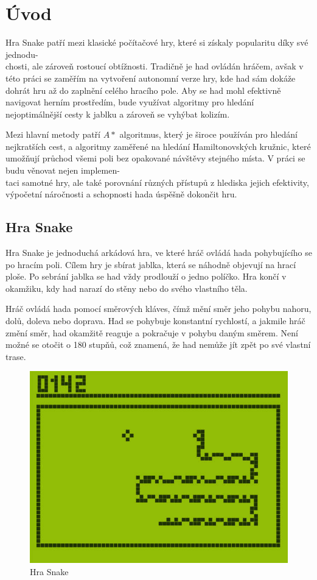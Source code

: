 \chapter{Úvod}

Hra Snake patří mezi klasické počítačové hry, které si získaly popularitu díky své jednodu-\\chosti, ale zároveň rostoucí obtížnosti. Tradičně je had ovládán hráčem, avšak v této práci se zaměřím na vytvoření autonomní verze hry, kde had sám dokáže dohrát hru až do zaplnění celého hracího pole. Aby se had mohl efektivně navigovat herním prostředím, bude využívat algoritmy pro hledání nejoptimálnější cesty k jablku a zároveň se vyhýbat kolizím. 

Mezi hlavní metody patří \(A*\) algoritmus, který je široce používán pro hledání nejkratších cest, a algoritmy zaměřené na hledání Hamiltonovských kružnic, které umožňují průchod všemi poli bez opakované návštěvy stejného místa. V práci se budu věnovat nejen implemen-\\taci samotné hry, ale také porovnání různých přístupů z hlediska jejich efektivity, výpočetní náročnosti a schopnosti hada úspěšně dokončit hru.

\section{Hra Snake}

Hra Snake je jednoduchá arkádová hra, ve které hráč ovládá hada pohybujícího se po hracím poli. Cílem hry je sbírat jablka, která se náhodně objevují na hrací ploše. Po sebrání jablka se had vždy prodlouží o jedno políčko. Hra končí v okamžiku, kdy had narazí do stěny nebo do svého vlastního těla.

Hráč ovládá hada pomocí směrových kláves, čímž mění směr jeho pohybu nahoru, dolů, doleva nebo doprava. Had se pohybuje konstantní rychlostí, a jakmile hráč změní směr, had okamžitě reaguje a pokračuje v pohybu daným směrem. Není možné se otočit o 180 stupňů, což znamená, že had nemůže jít zpět po své vlastní trase.

\begin{figure}[H]
    \centering
    \includegraphics[width=0.5\linewidth]{Images/SnakeGame.jpg}
    \caption[Dostupné z: \url{https://www.istockphoto.com/cs/search/2/image-film?phrase=snake+game}]{Hra Snake}
    \label{fig:SnakeGame}
\end{figure}


